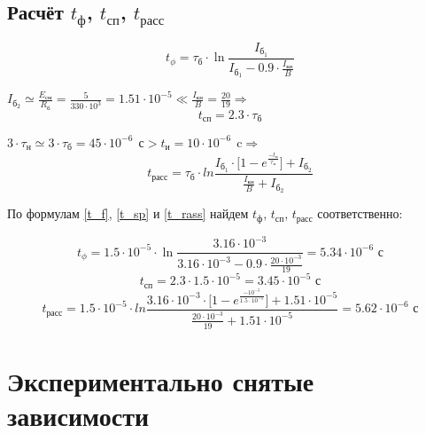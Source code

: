 \subsection{Расчёт $t_\text{ф}$, $t_\text{сп}$, $t_\text{расс}$}

\begin{equation}
\label{t_f}
t_\phi = \tau_{\text{б}} \cdot \ln{\frac{I_{\text{б}_1}}{I_{\text{б}_1} - 0.9 \cdot \frac{I_\text{кн}}{B}}}
\end{equation}

$I_{\text{б}_2} \simeq \frac{E_\text{см}}{R_\text{б}} = \frac{5}{330 \cdot 10^3} = 1.51 \cdot 10^{-5} \ll \frac{I_\text{кн}}{B} = \frac{20}{19} \Rightarrow$
\begin{equation}
\label{t_sp}
t_\text{сп} = 2.3 \cdot \tau_\text{б}
\end{equation}

$3 \cdot \tau_\text{н} \simeq 3 \cdot \tau_{\text{б}} = 45 \cdot 10^{-6}\ \ \text{с} > t_\text{и} = 10 \cdot 10^{-6}\ \ \text{c} \Rightarrow$
\begin{equation}
\label{t_rass}
t_\text{расс} = \tau_{\text{б}} \cdot ln{\frac{I_{\text{б}_1} \cdot \Big [ 1 - e^{\frac{-t_\text{и}}{\tau_\text{н}}} \Big ] + I_{\text{б}_2}}{\frac{I_\text{кн}}{B} + I_{\text{б}_2}}}
\end{equation}

По формулам \ref{t_f}, \ref{t_sp} и \ref{t_rass} найдем $t_\text{ф}$, $t_\text{сп}$, $t_\text{расс}$ соответственно:

\begin{equation*}
t_\phi = 1.5 \cdot 10^{-5} \cdot \ln{\frac{3.16 \cdot 10^{-3}}{3.16 \cdot 10^{-3} - 0.9 \cdot \frac{20 \cdot 10^{-3}}{19}}} = 5.34 \cdot 10^{-6} \text{ с}
\end{equation*}
\begin{equation*}
t_\text{сп} = 2.3 \cdot 1.5 \cdot 10^{-5} = 3.45 \cdot 10^{-5} \text{ с}
\end{equation*}
\begin{equation*}
t_\text{расс} = 1.5 \cdot 10^{-5} \cdot ln{\frac{3.16 \cdot 10^{-3} \cdot \Big [ 1 - e^{\frac{-10^{-5}}{1.5 \cdot 10^{-5}}} \Big ] + 1.51 \cdot 10^{-5}}{\frac{20 \cdot 10^{-3}}{19} + 1.51 \cdot 10^{-5}}} = 5.62 \cdot 10^{-6} \text{ с}
\end{equation*}


\section{Экспериментально снятые зависимости}

